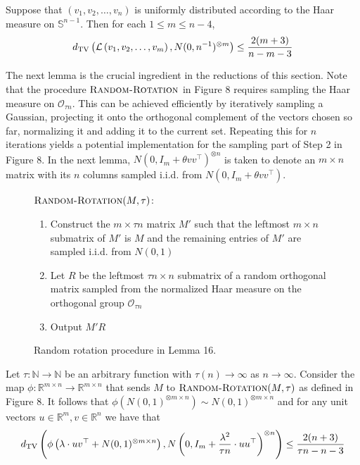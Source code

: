 \documentclass[11pt]{article}
\begin{document}
\begin{theorem}
Suppose that $(v_1, v_2, \dots, v_n)$ is uniformly distributed according to the Haar measure on $\mathbb{S}^{n-1}$. Then for each $1 \le m \le n - 4$,
$$d_{\text{TV}}\left( \mathcal{L}\left( v_1, v_2, \dots, v_m \right), N(0, n^{-1})^{\otimes m} \right) \le \frac{2(m+3)}{n - m - 3}$$
\end{theorem}

The next lemma is the crucial ingredient in the reductions of this section. Note that the procedure $\textsc{Random-Rotation}$ in Figure 8 requires sampling the Haar measure on $\mathcal{O}_{\tau n}$. This can be achieved efficiently by iteratively sampling a Gaussian, projecting it onto the orthogonal complement of the vectors chosen so far, normalizing it and adding it to the current set. Repeating this for $n$ iterations yields a potential implementation for the sampling part of Step 2 in Figure 8. In the next lemma, $N(0, I_m + \theta vv^\top)^{\otimes n}$ is taken to denote an $m \times n$ matrix with its $n$ columns sampled i.i.d. from $N(0, I_m + \theta vv^\top)$.

\begin{figure}[t!]
\begin{algbox}
$\textsc{Random-Rotation}(M, \tau)$:
\begin{enumerate}
\item Construct the $m \times \tau n$ matrix $M'$ such that the leftmost $m \times n$ submatrix of $M'$ is $M$ and the remaining entries of $M'$ are sampled i.i.d. from $N(0, 1)$
\item Let $R$ be the leftmost $\tau n \times n$ submatrix of a random orthogonal matrix sampled from the normalized Haar measure on the orthogonal group $\mathcal{O}_{\tau n}$
\item Output $M'R$
\end{enumerate}
\vspace{1mm}
\end{algbox}
\caption{Random rotation procedure in Lemma 16.}
\end{figure}

\begin{lemma}
Let $\tau : \mathbb{N} \to \mathbb{N}$ be an arbitrary function with $\tau(n) \to \infty$ as $n \to \infty$. Consider the map $\phi : \mathbb{R}^{m \times n} \to \mathbb{R}^{m \times n}$ that sends $M$ to $\textsc{Random-Rotation}(M, \tau)$ as defined in Figure 8. It follows that $\phi(N(0, 1)^{\otimes m \times n}) \sim N(0, 1)^{\otimes m \times n}$ and for any unit vectors $u \in \mathbb{R}^m, v \in \mathbb{R}^n$ we have that
$$d_{\text{TV}}\left( \phi\left( \lambda \cdot uv^\top + N(0, 1)^{\otimes m \times n} \right), N\left(0, I_m + \frac{\lambda^2}{\tau n} \cdot uu^\top\right)^{\otimes n} \right) \le \frac{2(n + 3)}{\tau n - n - 3}$$
\end{lemma}
\end{document}
